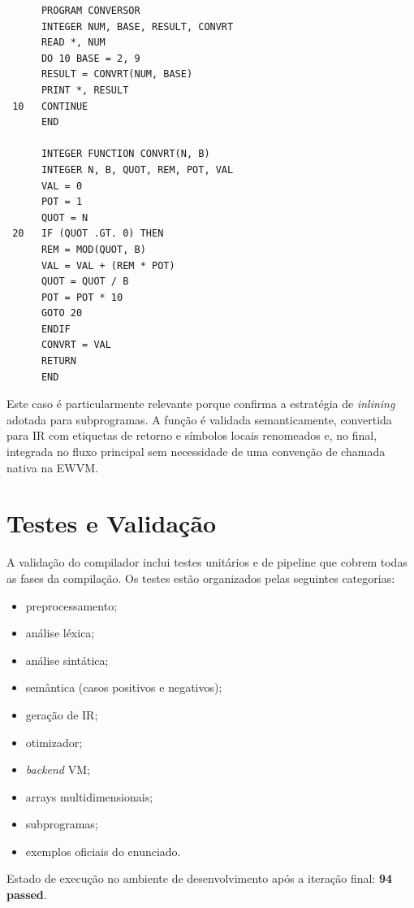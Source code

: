 \documentclass{article}
\begin{document}
\begin{verbatim}
      PROGRAM CONVERSOR
      INTEGER NUM, BASE, RESULT, CONVRT
      READ *, NUM
      DO 10 BASE = 2, 9
      RESULT = CONVRT(NUM, BASE)
      PRINT *, RESULT
 10   CONTINUE
      END

      INTEGER FUNCTION CONVRT(N, B)
      INTEGER N, B, QUOT, REM, POT, VAL
      VAL = 0
      POT = 1
      QUOT = N
 20   IF (QUOT .GT. 0) THEN
      REM = MOD(QUOT, B)
      VAL = VAL + (REM * POT)
      QUOT = QUOT / B
      POT = POT * 10
      GOTO 20
      ENDIF
      CONVRT = VAL
      RETURN
      END
\end{verbatim}

Este caso é particularmente relevante porque confirma a estratégia de \textit{inlining} adotada para
subprogramas. A função é validada semanticamente, convertida para IR com etiquetas de retorno
e símbolos locais renomeados e, no final, integrada no fluxo principal sem necessidade de uma
convenção de chamada nativa na EWVM.

\section{Testes e Validação}

A validação do compilador inclui testes unitários e de pipeline que cobrem todas as fases da
compilação. Os testes estão organizados pelas seguintes categorias:

\begin{itemize}
  \item preprocessamento;
  \item análise léxica;
  \item análise sintática;
  \item semântica (casos positivos e negativos);
  \item geração de IR;
  \item otimizador;
  \item \textit{backend} VM;
  \item arrays multidimensionais;
  \item subprogramas;
  \item exemplos oficiais do enunciado.
\end{itemize}

Estado de execução no ambiente de desenvolvimento após a iteração final:
\textbf{94 passed}.
\end{document}
